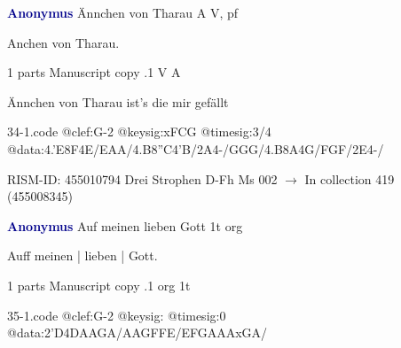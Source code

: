 \documentclass[twocolumn]{book}
\begin{document}
\newline \par \vspace{7pt} \textcolor{darkblue}{\textbf{Anonymus  }}
\newline Ännchen von Tharau  A  
\newline V, pf
\newline \begin{itshape}[heading, f.60v:] Anchen von Tharau.\end{itshape} 
\newline \textcolor{darkblue}{}  1 parts  
\newline Manuscript copy
.1  V  A
\newline \begin{footnotesize} Ännchen von Tharau ist's die mir gefällt \end{footnotesize}  
\begin{filecontents*}{34-1.code}
@clef:G-2
@keysig:xFCG
@timesig:3/4
@data:4.'E8F4E/EAA/4.B8''C4'B/2A4-/GGG/4.B8A4G/FGF/2E4-/
\end{filecontents*}
\newline
%

\newline RISM-ID: 455010794
\newline Drei Strophen
\newline D-Fh  Ms 002
\newline $\rightarrow$ In collection 419 (455008345)

\newline \par \vspace{7pt} \textcolor{darkblue}{\textbf{Anonymus  }}
\newline Auf meinen lieben Gott  1t  
\newline org
\newline \begin{itshape}[f.30v, at left:] Auff meinen | lieben | Gott.\end{itshape} 
\newline \textcolor{darkblue}{}  1 parts  
\newline Manuscript copy
.1  org  1t  
\begin{filecontents*}{35-1.code}
@clef:G-2
@keysig:
@timesig:0
@data:2'D4DAAGA/AAGFFE/EFGAAAxGA/
\end{filecontents*}
\newline
%
\end{document}
